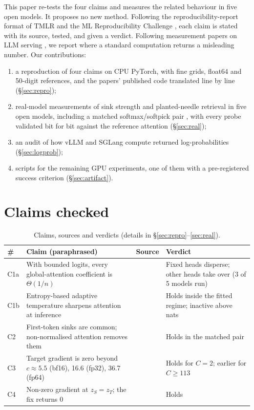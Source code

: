 \documentclass[10pt]{article}
\begin{document}
This paper re-tests the four claims and measures the related behaviour in five open models. It proposes no new method. Following the reproducibility-report format of TMLR and the ML Reproducibility Challenge \citep{lico}, each claim is stated with its source, tested, and given a verdict. Following measurement papers on LLM serving \citep{etalon,measbias}, we report where a standard computation returns a misleading number. Our contributions:
\begin{enumerate}[leftmargin=*,itemsep=1pt]
\item a reproduction of four claims on CPU PyTorch, with fine grids, float64 and 50-digit references, and the papers' published code translated line by line (\S\ref{sec:repro});
\item real-model measurements of sink strength and planted-needle retrieval in five open models, including a matched softmax/softpick pair \citep{softpickckpt}, with every probe validated bit for bit against the reference attention (\S\ref{sec:real});
\item an audit of how vLLM and SGLang compute returned log-probabilities (\S\ref{sec:logprob});
\item scripts for the remaining GPU experiments, one of them with a pre-registered success criterion (\S\ref{sec:artifact}).
\end{enumerate}

\section{Claims checked}
\begin{table}[t]
\centering\small
\caption{Claims, sources and verdicts (details in \S\ref{sec:repro}--\ref{sec:real}).}\label{tab:claims}
\begin{tabular}{p{0.6cm}p{5.6cm}p{2.6cm}p{4.4cm}}
\toprule
\# & Claim (paraphrased) & Source & Verdict \\
\midrule
C1a & With bounded logits, every global-attention coefficient is $\Theta(1/n)$ & \citet[Thm.~2.2]{velickovic} & Fixed heads disperse; other heads take over (3 of 5 models run) \\
C1b & Entropy-based adaptive temperature sharpens attention at inference & \citet[Fig.~4]{velickovic} & Holds inside the fitted regime; inactive above \polyHi{} nats \\
C2 & First-token sinks are common; non-normalised attention removes them & \citet{barbero,gu,softpick} & Holds in the matched pair \\
C3 & Target gradient is zero beyond $c\approx5.5$ (bf16), 16.6 (fp32), 36.7 (fp64) & \citet[\S1--2]{barron} & Holds for $C{=}2$; earlier for $C\geq113$ \\
C4 & Non-zero gradient at $z_S{=}z_T$; the fix returns 0 & \citet[\S3]{barron} & Holds \\
\bottomrule
\end{tabular}
\end{table}
\end{document}

